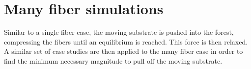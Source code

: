 \chapter{Many fiber simulations}

Similar to a single fiber case, the moving substrate is pushed into the forest, compressing the fibers until an equilibrium is reached. This force is then relaxed. A similar set of case studies are then applied to the many fiber case in order to find the minimum necessary magnitude to pull off the moving substrate.